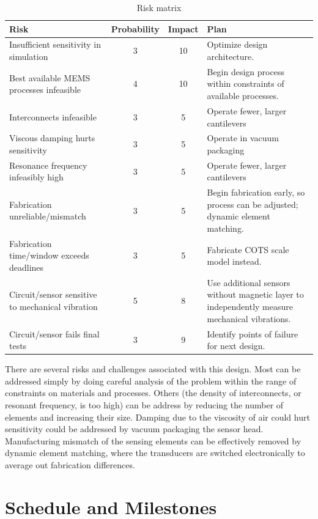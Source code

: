 \begin{table}[h!]
\centering
\begin{tabularx}{.85\textwidth}{|X||c|c|X|}
    \hline
    Risk & Probability & Impact & Plan\\
    \hline
    \hline
    Insufficient sensitivity in simulation & 3 & 10 & Optimize design architecture. \\
    \hline
    Best available MEMS processes infeasible & 4 & 10 & Begin design process within constraints of available processes. \\
    \hline
    Interconnects infeasible & 3 & 5 & Operate fewer, larger cantilevers \\
    \hline
    Viscous damping hurts sensitivity & 3 & 5 & Operate in vacuum packaging \\
    \hline
    Resonance frequency infeasibly high & 3  & 5 & Operate fewer, larger cantilevers \\
    \hline
    Fabrication unreliable/mismatch & 3 & 5 & Begin fabrication early, so process can be adjusted; dynamic element matching. \\
    \hline
    Fabrication time/window exceeds deadlines & 3 & 5 & Fabricate COTS scale model instead. \\
    \hline
    Circuit/sensor sensitive to mechanical vibration & 5 & 8 & Use additional sensors without magnetic layer to independently measure mechanical vibrations. \\
    \hline
    Circuit/sensor fails final tests & 3 & 9 & Identify points of failure for next design. \\
    \hline
\end{tabularx}
\caption{Risk matrix}
\label{table:risk}
\end{table}

There are several risks and challenges associated with this design. Most can be addressed simply by doing careful analysis of the problem within the range of constraints on materials and processes. Others (the density of interconnects, or resonant frequency, is too high) can be address by reducing the number of elements and increasing their size. Damping due to the viscosity of air could hurt sensitivity could be addressed by vacuum packaging the sensor head. Manufacturing mismatch of the sensing elements can be effectively removed by dynamic element matching, where the transducers are switched electronically to average out fabrication differences.

\section{Schedule and Milestones}

